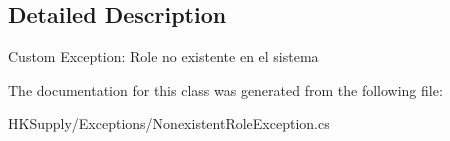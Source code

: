 \subsection{Detailed Description}
Custom Exception\+: Role no existente en el sistema 



The documentation for this class was generated from the following file\+:\begin{DoxyCompactItemize}
\item 
H\+K\+Supply/\+Exceptions/Nonexistent\+Role\+Exception.\+cs\end{DoxyCompactItemize}
